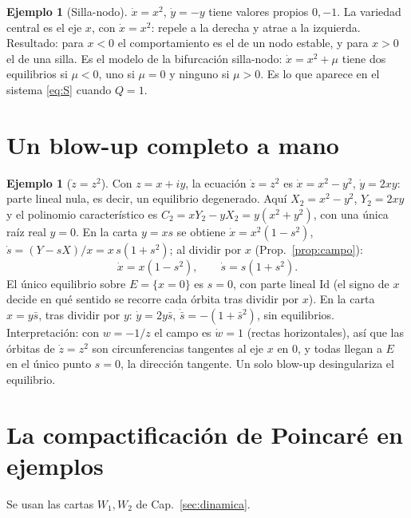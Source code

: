 \documentclass[11pt,a4paper,oneside]{book}
\theoremstyle{plain}
\theoremstyle{definition}
\newtheorem{ejemplo}[teorema]{Ejemplo}
\theoremstyle{remark}
\begin{document}
\begin{ejemplo}[Silla-nodo]\label{ej:sillanodo}
$\dot x=x^2$, $\dot y=-y$ tiene valores propios $0,-1$. La variedad central es el eje $x$, con $\dot x=x^2$: repele a la derecha y atrae a la izquierda. Resultado: para $x<0$ el comportamiento es el de un nodo estable, y para $x>0$ el de una silla. Es el modelo de la bifurcación silla-nodo: $\dot x=x^2+\mu$ tiene dos equilibrios si $\mu<0$, uno si $\mu=0$ y ninguno si $\mu>0$. Es lo que aparece en el sistema \eqref{eq:S} cuando $Q=1$.
\end{ejemplo}

\section{Un blow-up completo a mano}

\begin{ejemplo}[$\dot z=z^2$]\label{ej:z2}
Con $z=x+iy$, la ecuación $\dot z=z^2$ es $\dot x=x^2-y^2$, $\dot y=2xy$: parte lineal nula, es decir, un equilibrio degenerado. Aquí $X_2=x^2-y^2$, $Y_2=2xy$ y el polinomio característico es $C_2=xY_2-yX_2=y(x^2+y^2)$, con una única raíz real $y=0$. En la carta $y=xs$ se obtiene $\dot x=x^2(1-s^2)$, $\dot s=(Y-sX)/x=x\,s(1+s^2)$; al dividir por $x$ (Prop.~\ref{prop:campo}):
\[
\dot x=x(1-s^2),\qquad \dot s=s(1+s^2).
\]
El único equilibrio sobre $E=\{x=0\}$ es $s=0$, con parte lineal $\mathrm{Id}$ (el signo de $x$ decide en qué sentido se recorre cada órbita tras dividir por $x$). En la carta $x=y\bar s$, tras dividir por $y$: $\dot y=2y\bar s$, $\dot{\bar s}=-(1+\bar s^2)$, sin equilibrios. Interpretación: con $w=-1/z$ el campo es $\dot w=1$ (rectas horizontales), así que las órbitas de $\dot z=z^2$ son circunferencias tangentes al eje $x$ en $0$, y todas llegan a $E$ en el único punto $s=0$, la dirección tangente. Un solo blow-up desingulariza el equilibrio.
\end{ejemplo}

\section{La compactificación de Poincaré en ejemplos}

Se usan las cartas $W_1,W_2$ de Cap.~\ref{sec:dinamica}.
\end{document}
